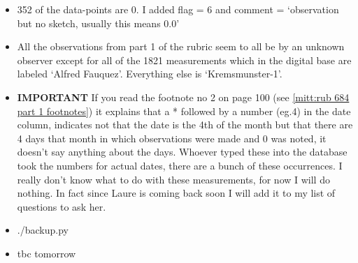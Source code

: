\documentclass[12pt]{article}
\begin{document}
\begin{itemize}
\begin{itemize}
\begin{itemize}
            \item 352 of the data-points are 0. I added flag = 6 and comment = `observation but no sketch, usually this means 0.0'
            \item All the observations from part 1 of the rubric seem to all be by an unknown observer except for all of the 1821 measurements which in the digital base are labeled `Alfred Fauquez'. Everything else is `Kremsmunster-1'.
            \item \textbf{IMPORTANT} If you read the footnote no 2 on page 100 (see \ref{mitt:rub 684 part 1 footnotes}) it explains that a * followed by a number (eg.4) in the date column, indicates not that the date is the 4th of the month but that there are 4 days that month in which observations were made and 0 was noted, it doesn't say anything about the days. Whoever typed these into the database took the numbers for actual dates, there are a bunch of these occurrences. I really don't know what to do with these measurements, for now I will do nothing. In fact since Laure is coming back soon I will add it to my list of questions to ask her.
            \item ./backup.py
            \item tbc tomorrow
        \end{itemize}
    \end{itemize}
\end{itemize}
\end{document}
